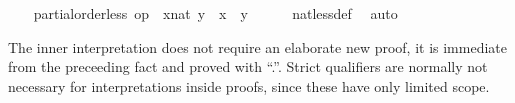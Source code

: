 \begin{isabellebody}
\isanewline
\ \ \isamarkupfalse%
\ {\isachardoublequoteopen}partial{\isacharunderscore}order{\isachardot}less\ op\ {\isasymle}\ {\isacharparenleft}x{\isacharcolon}{\isacharcolon}nat{\isacharparenright}\ y\ {\isacharequal}\ {\isacharparenleft}x\ {\isacharless}\ y{\isacharparenright}{\isachardoublequoteclose}\isanewline
\ \ \ \ \isamarkupfalse%
\ nat{\isachardot}less{\isacharunderscore}def\ \isamarkupfalse%
\ auto\isanewline
{}\isamarkupfalse%
%
\endisatagvisible
{\isafoldvisible}%
%
\isadelimvisible
%
\endisadelimvisible
%
\begin{isamarkuptext}%
The inner interpretation does not require an
  elaborate new proof, it is immediate from the preceeding fact and
  proved with ``.''.  Strict qualifiers are normally not necessary for
  interpretations inside proofs, since these have only limited scope.


\end{isamarkuptext}
\end{isabellebody}
